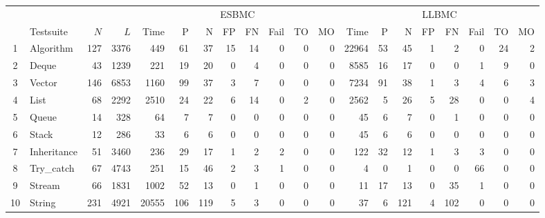 \documentclass[a4paper]{llncs}
\begin{document}
\begin{table*}[t!]
\begin{adjustwidth}{-2cm}{}
\renewcommand\arraystretch{0.9}
\setlength{\tabcolsep}{4pt}
\begin{center} {\small
\begin{tabular}{|c|l|r|r||r|r|r|r|r|r|r|r|r|r|r|r|r|r|r|r|}
\hline
  & & & & \multicolumn{8}{c|}{ESBMC}                                                     & \multicolumn{8}{c|}{LLBMC} \\  \cline{5-20}
  & Testsuite   & $N$  & $L$   & Time  & P    & N   & FP  & FN   & Fail & TO   & MO    & Time   & P   & N   & FP  & FN  & Fail & TO  & MO \\\hline
1 & Algorithm   & 127  & 3376  & 449   & 61   & 37  & 15  & 14   & 0    & 0    & 0     & 22964  & 53  & 45  & 1   & 2   & 0    & 24  & 2\\ %
\hline
2 & Deque       & 43   & 1239  & 221   & 19   & 20  & 0   & 4    & 0    & 0    & 0     & 8585   & 16  & 17  & 0   & 0   & 1    & 9   & 0\\ %
\hline
3 & Vector      & 146  & 6853  & 1160  & 99   & 37  & 3   & 7    & 0    & 0    & 0     & 7234   & 91  & 38  & 1   & 3   & 4    & 6   & 3\\ %
\hline
4 & List        & 68   & 2292  & 2510  & 24   & 22  & 6   & 14   & 0    & 2    & 0     & 2562   & 5   & 26  & 5   & 28  & 0    & 0   & 4\\ %
\hline
5 & Queue       & 14   & 328   & 64    & 7    & 7   & 0   & 0    & 0    & 0    & 0     & 45     & 6   & 7   & 0   & 1   & 0    & 0   & 0\\ %
\hline
6 & Stack       & 12   & 286   & 33    & 6    & 6   & 0   & 0    & 0    & 0    & 0     & 45     & 6   & 6   & 0   & 0   & 0    & 0   & 0\\ %
\hline
7 & Inheritance & 51   & 3460  & 236   & 29   & 17  & 1   & 2    & 2    & 0    & 0     & 122    & 32  & 12  & 1   & 3   & 3    & 0   & 0\\ %
\hline
8 & Try\_catch  & 67   & 4743  & 251   & 15   & 46  & 2   & 3    & 1    & 0    & 0     & 4      & 0   & 1   & 0   & 0   & 66   & 0   & 0 \\ %
\hline
9 & Stream      & 66   & 1831  & 1002  & 52   & 13  & 0   & 1    & 0    & 0    & 0     & 11     & 17  & 13  & 0   & 35  & 1    & 0   & 0\\ %
\hline
10 & String     & 231  & 4921  & 20555 & 106  & 119 & 5   & 3    & 0    & 0    & 0     & 37     & 6   & 121 & 4   & 102 & 0    & 0   & 0\\ %

\end{tabular}}
\end{center}
\end{adjustwidth}
\end{table*}
\end{document}
